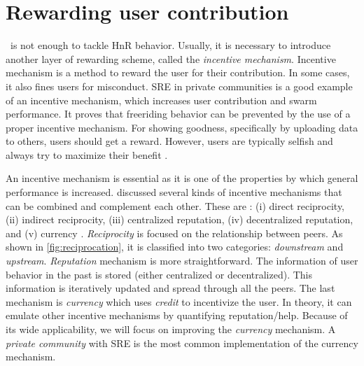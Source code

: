 
\section{Rewarding user contribution}
\label{sec:userreward}

\bt~is not enough to tackle HnR behavior. Usually, it is necessary to introduce another layer of rewarding scheme, called the \textit{incentive mechanism}. Incentive mechanism is a method to reward the user for their contribution. In some cases, it also fines users for misconduct. SRE in private communities is a good example of an incentive mechanism, which increases user contribution and swarm performance. It proves that freeriding behavior can be prevented by the use of a proper incentive mechanism. For showing goodness, specifically by uploading data to others, users should get a reward. However, users are typically selfish and always try to maximize their benefit \cite{2015:incentivep2pgame:kang}.

An incentive mechanism is essential as it is one of the properties by which general performance is increased. \citeauthor{2011:managesupplydemand:meulpolder} discussed several kinds of incentive mechanisms that can be combined and complement each other. These are : (i) direct reciprocity, (ii) indirect reciprocity, (iii) centralized reputation, (iv) decentralized reputation, and (v) currency \cite{2011:managesupplydemand:meulpolder}. \textit{Reciprocity} is focused on the relationship between peers. As shown in \ref{fig:reciprocation}, it is classified into two categories: \textit{downstream} and \textit{upstream}. \textit{Reputation} mechanism is more straightforward. The information of user behavior in the past is stored (either centralized or decentralized). This information is iteratively updated and spread through all the peers. The last mechanism is \textit{currency} which uses \textit{credit} to incentivize the user. In theory, it can emulate other incentive mechanisms by quantifying reputation/help. Because of its wide applicability, we will focus on improving the \textit{currency} mechanism.  A \textit{private community} with SRE is the most common implementation of the currency mechanism. 

